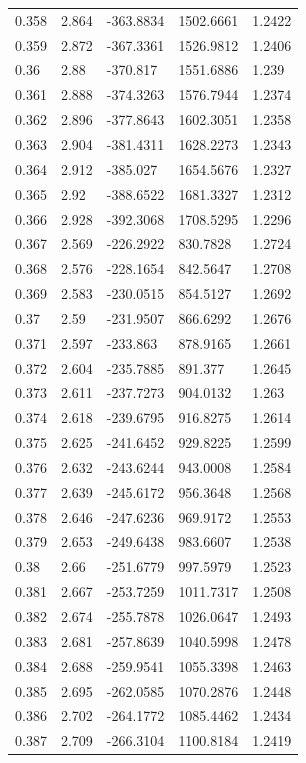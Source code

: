 \begin{tabular}{lllll}
0.358 & 2.864 & -363.8834 & 1502.6661 & 1.2422 \\
0.359 & 2.872 & -367.3361 & 1526.9812 & 1.2406 \\
0.36 & 2.88 & -370.817 & 1551.6886 & 1.239 \\
0.361 & 2.888 & -374.3263 & 1576.7944 & 1.2374 \\
0.362 & 2.896 & -377.8643 & 1602.3051 & 1.2358 \\
0.363 & 2.904 & -381.4311 & 1628.2273 & 1.2343 \\
0.364 & 2.912 & -385.027 & 1654.5676 & 1.2327 \\
0.365 & 2.92 & -388.6522 & 1681.3327 & 1.2312 \\
0.366 & 2.928 & -392.3068 & 1708.5295 & 1.2296 \\
0.367 & 2.569 & -226.2922 & 830.7828 & 1.2724 \\
0.368 & 2.576 & -228.1654 & 842.5647 & 1.2708 \\
0.369 & 2.583 & -230.0515 & 854.5127 & 1.2692 \\
0.37 & 2.59 & -231.9507 & 866.6292 & 1.2676 \\
0.371 & 2.597 & -233.863 & 878.9165 & 1.2661 \\
0.372 & 2.604 & -235.7885 & 891.377 & 1.2645 \\
0.373 & 2.611 & -237.7273 & 904.0132 & 1.263 \\
0.374 & 2.618 & -239.6795 & 916.8275 & 1.2614 \\
0.375 & 2.625 & -241.6452 & 929.8225 & 1.2599 \\
0.376 & 2.632 & -243.6244 & 943.0008 & 1.2584 \\
0.377 & 2.639 & -245.6172 & 956.3648 & 1.2568 \\
0.378 & 2.646 & -247.6236 & 969.9172 & 1.2553 \\
0.379 & 2.653 & -249.6438 & 983.6607 & 1.2538 \\
0.38 & 2.66 & -251.6779 & 997.5979 & 1.2523 \\
0.381 & 2.667 & -253.7259 & 1011.7317 & 1.2508 \\
0.382 & 2.674 & -255.7878 & 1026.0647 & 1.2493 \\
0.383 & 2.681 & -257.8639 & 1040.5998 & 1.2478 \\
0.384 & 2.688 & -259.9541 & 1055.3398 & 1.2463 \\
0.385 & 2.695 & -262.0585 & 1070.2876 & 1.2448 \\
0.386 & 2.702 & -264.1772 & 1085.4462 & 1.2434 \\
0.387 & 2.709 & -266.3104 & 1100.8184 & 1.2419 \\

\end{tabular}
